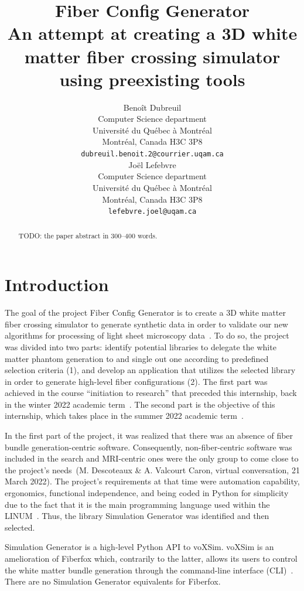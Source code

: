 \documentclass{article}
\title{
  Fiber Config Generator \\
  An attempt at creating a 3D white matter fiber crossing simulator using preexisting tools}
\author{
  Benoît Dubreuil \\
  Computer Science department \\
  Université du Québec à Montréal \\
  Montréal, Canada H3C 3P8 \\
  \texttt{dubreuil.benoit.2@courrier.uqam.ca} \\
  \And
  Joël Lefebvre \\
  Computer Science department\\
  Université du Québec à Montréal \\
  Montréal, Canada H3C 3P8\\
  \texttt{lefebvre.joel@uqam.ca} \\
}
\begin{document}
  \maketitle

  \begin{abstract}
    TODO: the paper abstract in 300--400 words.
  \end{abstract}


  \section{Introduction}\label{sec:introduction}

  The goal of the project Fiber Config Generator is to create a 3D white matter fiber crossing simulator to generate synthetic data in order to validate our new algorithms for processing of light sheet microscopy data~\cite{oliveirasicard2021orientation3d}.
  To do so, the project was divided into two parts: identify potential libraries to delegate the white matter phantom
  generation to and single out one according to predefined selection criteria (1), and develop an application that utilizes the selected library in order to generate high-level fiber configurations (2).
  The first part was achieved in the course ``initiation to research'' that preceded this internship, back in the winter 2022 academic term~\cite{dubreuil2022inf6200}.
  The second part is the objective of this internship, which takes place in the summer 2022 academic term~\cite{dubreuil2022inm5803fiberconfiggen, dubreuil2022inm5803simgenfork}.

  In the first part of the project, it was realized that there was an absence of fiber bundle generation-centric software.
  Consequently, non-fiber-centric software was included in the search and MRI-centric ones were the only group to come close to the project's needs~\nocite{descoteauxvalcourtcaron2022othertoolsthanfiberfox}(M. Descoteaux \& A. Valcourt Caron, virtual conversation, 21 March 2022).
  The project's requirements at that time were automation capability, ergonomics, functional independence, and being coded in Python for simplicity due to the fact that it is the main programming language used within the LINUM~\cite{dubreuil2022inf6200}.
  Thus, the library Simulation Generator was identified and then selected.

  Simulation Generator is a high-level Python API to voXSim.
  voXSim is an amelioration of Fiberfox which, contrarily to the latter, allows its users to control the white matter
  bundle generation through the command-line interface (CLI)~\cite{valcourtcaron2022simulationgenerator, neher2014fiberfox}.
  There are no Simulation Generator equivalents for Fiberfox.
\end{document}
